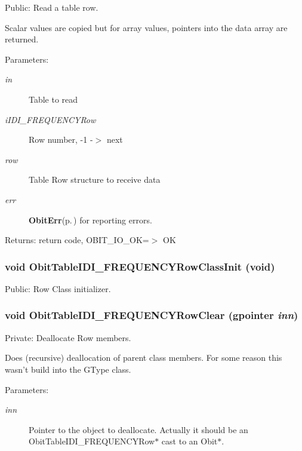 Public: Read a table row. 

Scalar values are copied but for array values, pointers into the data array are returned. \begin{Desc}
\item[Parameters:]
\begin{description}
\item[{\em in}]Table to read \item[{\em i\-IDI\_\-FREQUENCYRow}]Row number, -1 -$>$ next \item[{\em row}]Table Row structure to receive data \item[{\em err}]{\bf Obit\-Err}{\rm (p.\,\pageref{structObitErr})} for reporting errors. \end{description}
\end{Desc}
\begin{Desc}
\item[Returns:]return code, OBIT\_\-IO\_\-OK=$>$ OK \end{Desc}
\subsubsection{\setlength{\rightskip}{0pt plus 5cm}void Obit\-Table\-IDI\_\-FREQUENCYRow\-Class\-Init (void)}\label{ObitTableIDI__FREQUENCY_8c_a26}


Public: Row Class initializer. 

\subsubsection{\setlength{\rightskip}{0pt plus 5cm}void Obit\-Table\-IDI\_\-FREQUENCYRow\-Clear (gpointer {\em inn})}\label{ObitTableIDI__FREQUENCY_8c_a7}


Private: Deallocate Row members. 

Does (recursive) deallocation of parent class members. For some reason this wasn't build into the GType class. \begin{Desc}
\item[Parameters:]
\begin{description}
\item[{\em inn}]Pointer to the object to deallocate. Actually it should be an Obit\-Table\-IDI\_\-FREQUENCYRow$\ast$ cast to an Obit$\ast$. \end{description}
\end{Desc}
